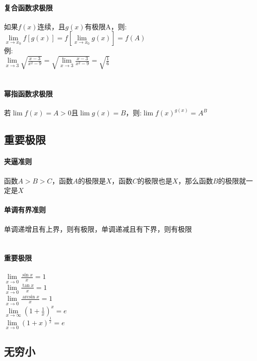 \documentclass{article}
\begin{document}
\begin{flushleft}
	\paragraph{复合函数求极限}
	如果$f(x)$连续，且$g(x)$有极限A，则:\\
	$\lim\limits_{x\to x_0} f[g(x)]=f[\lim\limits_{x\to x_0}g(x)]=f(A)$\\
	例:\\
	$\lim\limits_{x\to 3} \sqrt{\frac{x-3}{x^2-9}}= \sqrt{\lim\limits_{x\to 3} \frac{x-3}{x^2-9}}=\sqrt{\frac{1}{6}}$\\
	~\\
	\paragraph{幂指函数求极限}
	若$\lim f(x)=A>0$且$\lim g(x)=B$，则:$\lim f(x)^{g(x)}=A^B$\\
	
	\subsection{重要极限}
	
	\paragraph{夹逼准则}
	函数$A>B>C$，函数$A$的极限是$X$，函数$C$的极限也是$X$，那么函数$B$的极限就一定是$X$\\
	\paragraph{单调有界准则}
	单调递增且有上界，则有极限，单调递减且有下界，则有极限\\
	~\\
	\paragraph{重要极限}
	$\lim\limits_{x\to 0} \frac{\sin x}{x}=1$\\
	$\lim\limits_{x\to 0} \frac{\tan x}{x}=1$\\
	$\lim\limits_{x\to 0} \frac{\arcsin x}{x}=1$\\
	$\lim\limits_{x\to \infty} (1+\frac{1}{x})^x=e$\\
	$\lim\limits_{x\to 0} (1+x)^{\frac{1}{x}}=e$\\
	
	\subsection{无穷小}
	

\end{flushleft}
\end{document}
